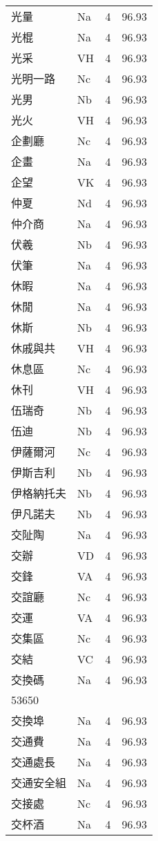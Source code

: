 \documentclass[twocolumn]{book}
\begin{document}
\begin{supertabular}{llrr}
光量 & Na & 4 &  96.93\\
光棍 & Na & 4 &  96.93\\
光采 & VH & 4 &  96.93\\
光明一路 & Nc & 4 &  96.93\\
光男 & Nb & 4 &  96.93\\
光火 & VH & 4 &  96.93\\
企劃廳 & Nc & 4 &  96.93\\
企畫 & Na & 4 &  96.93\\
企望 & VK & 4 &  96.93\\
仲夏 & Nd & 4 &  96.93\\
仲介商 & Na & 4 &  96.93\\
伏羲 & Nb & 4 &  96.93\\
伏筆 & Na & 4 &  96.93\\
休暇 & Na & 4 &  96.93\\
休閒 & Na & 4 &  96.93\\
休斯 & Nb & 4 &  96.93\\
休戚與共 & VH & 4 &  96.93\\
休息區 & Nc & 4 &  96.93\\
休刊 & VH & 4 &  96.93\\
伍瑞奇 & Nb & 4 &  96.93\\
伍迪 & Nb & 4 &  96.93\\
伊薩爾河 & Nc & 4 &  96.93\\
伊斯吉利 & Nb & 4 &  96.93\\
伊格納托夫 & Nb & 4 &  96.93\\
伊凡諾夫 & Nb & 4 &  96.93\\
交阯陶 & Na & 4 &  96.93\\
交辦 & VD & 4 &  96.93\\
交鋒 & VA & 4 &  96.93\\
交誼廳 & Nc & 4 &  96.93\\
交運 & VA & 4 &  96.93\\
交集區 & Nc & 4 &  96.93\\
交結 & VC & 4 &  96.93\\
交換碼 & Na & 4 &  96.93\\
53650\\
交換埠 & Na & 4 &  96.93\\
交通費 & Na & 4 &  96.93\\
交通處長 & Na & 4 &  96.93\\
交通安全組 & Na & 4 &  96.93\\
交接處 & Nc & 4 &  96.93\\
交杯酒 & Na & 4 &  96.93\\

\end{supertabular}
\end{document}
